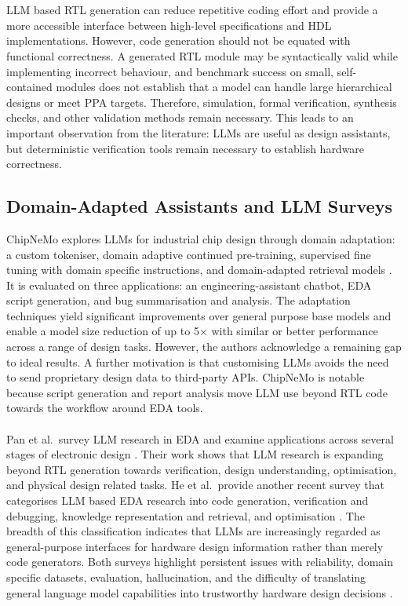 \documentclass[conference]{IEEEtran}
\begin{document}
\\\\
\noindent LLM based RTL generation can reduce repetitive coding effort and provide a more accessible interface between high-level specifications and HDL implementations. However, code generation should not be equated with functional correctness. A generated RTL module may be syntactically valid while implementing incorrect behaviour, and benchmark success on small, self-contained modules does not establish that a model can handle large hierarchical designs or meet PPA targets. Therefore, simulation, formal verification, synthesis checks, and other validation methods remain necessary. This leads to an important observation from the literature: LLMs are useful as design assistants, but deterministic verification tools remain necessary to establish hardware correctness.

\subsection{Domain-Adapted Assistants and LLM Surveys}\label{L4}

\noindent ChipNeMo explores LLMs for industrial chip design through domain adaptation: a custom tokeniser, domain adaptive continued pre-training, supervised fine tuning with domain  specific instructions, and domain-adapted retrieval models \cite{P14_Liu2023ChipNeMo}. It is evaluated on three applications: an engineering-assistant chatbot, EDA script generation, and bug summarisation and analysis. The adaptation techniques yield significant improvements over general purpose base models and enable a model size reduction of up to 5× with similar or better performance across a range of design tasks. However, the authors acknowledge a remaining gap to ideal results. A further motivation is that customising LLMs avoids the need to send proprietary design data to third-party APIs. ChipNeMo is notable because script generation and report analysis move LLM use beyond RTL code towards the workflow around EDA tools.
\\\\
\noindent Pan et al.\ survey LLM research in EDA and examine applications across several stages of electronic design \cite{P6_Pan2025}. Their work shows that LLM research is expanding beyond RTL generation towards verification, design understanding, optimisation, and physical design related tasks. He et al.\ provide another recent survey that categorises LLM based EDA research into code generation, verification and debugging, knowledge representation and retrieval, and optimisation \cite{P7_He2025}. The breadth of this classification indicates that LLMs are increasingly regarded as general-purpose interfaces for hardware design information rather than merely code generators. Both surveys highlight persistent issues with reliability, domain specific datasets, evaluation, hallucination, and the difficulty of translating general language model capabilities into trustworthy hardware design decisions \cite{P6_Pan2025,P7_He2025}.
\end{document}
